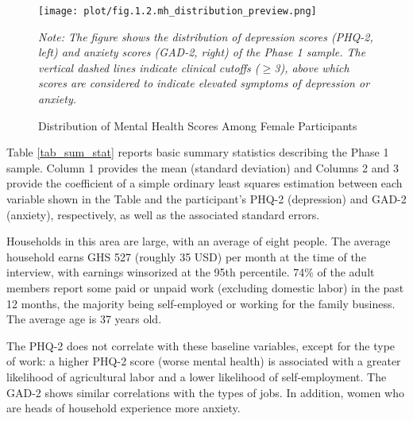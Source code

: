 \documentclass[12pt, a4paper, american]{article}
\begin{document}
\begin{figure}[H]
   \centering
   \texttt{[image: plot/fig.1.2.mh\_distribution\_preview.png]}
   \caption{Distribution of Mental Health Scores Among Female Participants}
   \label{fig:mh_dist}
   \flushleft
   \textit{Note: The figure shows the distribution of depression scores (PHQ-2, left) and anxiety scores (GAD-2, right) of the Phase 1 sample. The vertical dashed lines indicate clinical cutoffs ($\geq$3), above which scores are considered to indicate elevated symptoms of depression or anxiety.} 
\end{figure}

Table \ref{tab_sum_stat} reports basic summary statistics describing the Phase 1 sample. Column 1 provides the mean (standard deviation) and Columns 2 and 3 provide the coefficient of a simple ordinary least squares estimation between each variable shown in the Table and the participant's PHQ-2 (depression) and GAD-2 (anxiety), respectively, as well as the associated standard errors. 

Households in this area are large, with an average of eight people. The average household earns GHS 527 (roughly 35 USD) per month at the time of the interview, with earnings winsorized at the 95th percentile. 74\% of the adult members report some paid or unpaid work (excluding domestic labor) in the past 12 months, the majority being self-employed or working for the family business. The average age is 37 years old. 

The PHQ-2 does not correlate with these baseline variables, except for the type of work: a higher PHQ-2 score (worse mental health) is associated with a greater likelihood of agricultural labor and a lower likelihood of self-employment. The GAD-2 shows similar correlations with the types of jobs. In addition, women who are heads of household experience more anxiety.
\end{document}
